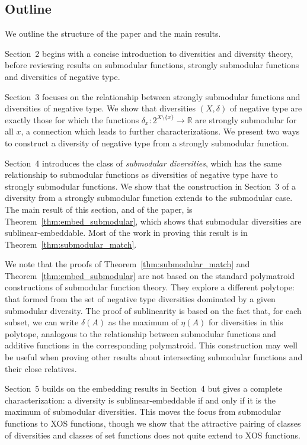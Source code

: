 \documentclass{article}
\theoremstyle{plain}
\theoremstyle{definition}
\renewcommand{\Re}{\mathbb{R}}
\begin{document}
%

\subsection*{Outline}

We outline the structure of the paper and the main results.

Section~2 begins with a concise introduction to diversities and diversity theory, before reviewing results on submodular functions, strongly submodular functions and diversities of negative type. 

Section~3 focuses on the relationship between strongly submodular functions and diversities of negative type. We show that diversities $(X,\delta)$ of negative type are exactly those for which the functions $\delta_x:2^{X \setminus \{x\}} \rightarrow \Re$ are strongly submodular for all $x$, a connection which leads to further characterizations. We present two ways to construct a diversity of negative type from a strongly submodular function. 

Section~4 introduces the class of {\em submodular diversities}, which has the same relationship to submodular functions as diversities of negative type have to strongly submodular functions. We show that the construction in Section~3 of a diversity from a strongly submodular function extends to the submodular case. The main result of this section, and of the paper, is Theorem~\ref{thm:embed_submodular}, which shows that submodular diversities are sublinear-embeddable. Most of the work in proving this result is in Theorem~\ref{thm:submodular_match}. 

We note that the proofs of Theorem~\ref{thm:submodular_match} and Theorem~\ref{thm:embed_submodular} are not based on the standard polymatroid constructions of submodular function theory. They explore a different polytope: that formed from the set of negative type diversities dominated by a given submodular diversity. The proof of sublinearity is based on the fact that, for each subset, we can write $\delta(A)$ as the maximum of $\eta(A)$ for diversities in this polytope, analogous to the relationship between submodular functions and additive functions in the corresponding polymatroid. This construction may well be useful when proving other results about intersecting submodular functions and their close relatives. 

Section~5 builds on the embedding results in Section~4 but gives a complete characterization: a diversity is sublinear-embeddable if and only if it is the maximum of submodular diversities. This moves the focus from submodular functions to XOS functions, though we show that the attractive pairing of classes of diversities and classes of set functions does not quite extend to XOS functions. 
\end{document}
